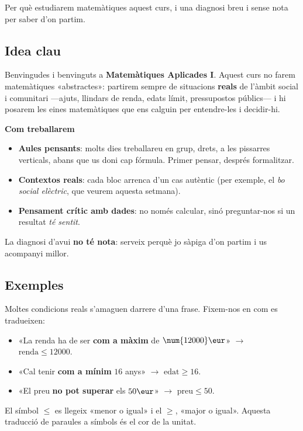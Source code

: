 %
{Per què estudiarem matemàtiques aquest curs, i una diagnosi breu i sense nota per saber d'on partim.}

\subsection{Idea clau}

Benvingudes i benvinguts a \textbf{Matemàtiques Aplicades I}. Aquest curs no farem
matemàtiques «abstractes»: partirem sempre de situacions \textbf{reals} de l'àmbit
social i comunitari —ajuts, llindars de renda, edats límit, pressupostos públics— i
hi posarem les eines matemàtiques que ens calguin per entendre-les i decidir-hi.

\begin{idea}
\textbf{Com treballarem}
\begin{itemize}[leftmargin=1.4em, itemsep=2pt]
  \item \textbf{Aules pensants}: molts dies treballareu en grup, drets, a les
        pissarres verticals, abans que us doni cap fórmula. Primer pensar, després
        formalitzar.
  \item \textbf{Contextos reals}: cada bloc arrenca d'un cas autèntic (per exemple, el
        \emph{bo social elèctric}, que veurem aquesta setmana).
  \item \textbf{Pensament crític amb dades}: no només calcular, sinó preguntar-nos si
        un resultat \emph{té sentit}.
\end{itemize}
La diagnosi d'avui \textbf{no té nota}: serveix perquè jo sàpiga d'on partim i us
acompanyi millor.
\end{idea}

\subsection{Exemples}

\begin{exemple}
Moltes condicions reals s'amaguen darrere d'una frase. Fixem-nos en com es tradueixen:
\begin{itemize}[leftmargin=1.4em, itemsep=2pt]
  \item «La renda ha de ser \textbf{com a màxim} de $\num{12000}\eur$» $\rightarrow$
        $\text{renda}\le \num{12000}$.
  \item «Cal tenir \textbf{com a mínim} $16$ anys» $\rightarrow$ $\text{edat}\ge 16$.
  \item «El preu \textbf{no pot superar} els $50\eur$» $\rightarrow$ $\text{preu}\le 50$.
\end{itemize}
El símbol $\le$ es llegeix «menor o igual» i el $\ge$, «major o igual». Aquesta
traducció de paraules a símbols és el cor de la unitat.
\end{exemple}


